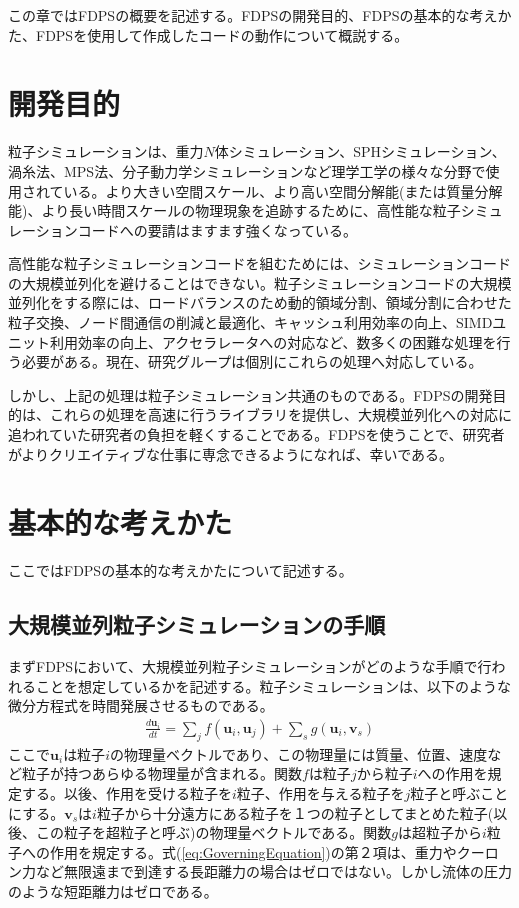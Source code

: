 この章ではFDPSの概要を記述する。FDPSの開発目的、FDPSの基本的な考えかた、FDPSを使用して作成したコードの動作について概説する。

\section{開発目的}

粒子シミュレーションは、重力$N$体シミュレーション、SPHシミュレーション、渦糸法、MPS法、分子動力学シミュレーションなど理学工学の様々な分野で使用されている。より大きい空間スケール、より高い空間分解能(または質量分解能)、より長い時間スケールの物理現象を追跡するために、高性能な粒子シミュレーションコードへの要請はますます強くなっている。

高性能な粒子シミュレーションコードを組むためには、シミュレーションコードの大規模並列化を避けることはできない。粒子シミュレーションコードの大規模並列化をする際には、ロードバランスのため動的領域分割、領域分割に合わせた粒子交換、ノード間通信の削減と最適化、キャッシュ利用効率の向上、SIMDユニット利用効率の向上、アクセラレータへの対応など、数多くの困難な処理を行う必要がある。現在、研究グループは個別にこれらの処理へ対応している。

しかし、上記の処理は粒子シミュレーション共通のものである。FDPSの開発目的は、これらの処理を高速に行うライブラリを提供し、大規模並列化への対応に追われていた研究者の負担を軽くすることである。FDPSを使うことで、研究者がよりクリエイティブな仕事に専念できるようになれば、幸いである。

\section{基本的な考えかた}

ここではFDPSの基本的な考えかたについて記述する。

\subsection{大規模並列粒子シミュレーションの手順}
\label{subsec:pcr_of_massively_parallel_ptcl_sim}

まずFDPSにおいて、大規模並列粒子シミュレーションがどのような手順で行われることを想定しているかを記述する。粒子シミュレーションは、以下のような微分方程式を時間発展させるものである。
\begin{align}
    \frac{d\bm{u}_i}{dt} = \sum_j f(\bm{u}_i,\bm{u}_j) + \sum_s
    g(\bm{u}_i,\bm{v}_s) \label{eq:GoverningEquation}
\end{align}
ここで$\bm{u}_i$は粒子$i$の物理量ベクトルであり、この物理量には質量、位置、速度など粒子が持つあらゆる物理量が含まれる。関数$f$は粒子$j$から粒子$i$への作用を規定する。以後、作用を受ける粒子を$i$粒子、作用を与える粒子を$j$粒子と呼ぶことにする。$\bm{v}_s$は$i$粒子から十分遠方にある粒子を１つの粒子としてまとめた粒子(以後、この粒子を超粒子と呼ぶ)の物理量ベクトルである。関数$g$は超粒子から$i$粒子への作用を規定する。式(\ref{eq:GoverningEquation})の第２項は、重力やクーロン力など無限遠まで到達する長距離力の場合はゼロではない。しかし流体の圧力のような短距離力はゼロである。

